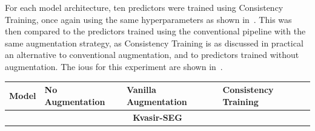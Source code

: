 For each model architecture, ten predictors were trained using Consistency Training, once again using the same hyperparameters as shown in~. This was then compared to the predictors trained using the conventional pipeline with the same augmentation strategy, as Consistency Training is as discussed in practical an alternative to conventional augmentation, and to predictors trained without augmentation. The \glspl{iou} for this experiment are shown in~.

\begin{table}[htb]
    \centering
\begin{tabularx}{\linewidth}{llXX}
\toprule
\textbf{Model} & \textbf{No Augmentation} & \textbf{Vanilla Augmentation} & \textbf{Consistency Training}\\
\toprule
\multicolumn{4}{c}{\textbf{Kvasir-SEG  }}\\
\midrule


\end{tabularx}
\end{table}
